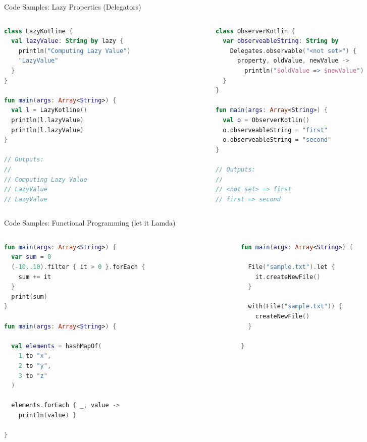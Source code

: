 \begin{frame}[fragile]{Code Samples: Lazy Properties (Delegators)}
	\begin{columns}
		\begin{column}{0.5\textwidth}
\begin{lstlisting}[language=Kotlin,basicstyle=\ttfamily\tiny]
class LazyKotline {
  val lazyValue: String by lazy {
    println("Computing Lazy Value")
    "LazyValue"
  }
}

fun main(args: Array<String>) {
  val l = LazyKotline()
  println(l.lazyValue)
  println(l.lazyValue)
}

// Outputs:
//
// Computing Lazy Value
// LazyValue
// LazyValue
\end{lstlisting}
		\end{column}
		\begin{column}{0.5\textwidth}
\begin{lstlisting}[language=Kotlin,basicstyle=\ttfamily\tiny]
class ObserverKotlin {
  var observeableString: String by
    Delegates.observable("<not set>") {
      property, oldValue, newValue ->
        println("$oldValue => $newValue")
  }
}

fun main(args: Array<String>) {
  val o = ObserverKotlin()
  o.observeableString = "first"
  o.observeableString = "second"
}

// Outputs:
//
// <not set> => first
// first => second
\end{lstlisting}
		\end{column}
	\end{columns}
\end{frame}

\begin{frame}[fragile]{Code Samples: Functional Programming (let it Lamda)}
	\begin{columns}
		\begin{column}{0.5\textwidth}
\begin{lstlisting}[language=Kotlin,basicstyle=\ttfamily\tiny]
fun main(args: Array<String>) {
  var sum = 0
  (-10..10).filter { it > 0 }.forEach {
    sum += it
  }
  print(sum)
}

fun main(args: Array<String>) {

  val elements = hashMapOf(
    1 to "x",
    2 to "y",
    3 to "z"
  )

  elements.forEach { _, value ->
    println(value) }

}
\end{lstlisting}
		\end{column}
		\begin{column}{0.5\textwidth}
\begin{lstlisting}[language=Kotlin,basicstyle=\ttfamily\tiny]
fun main(args: Array<String>) {

  File("sample.txt").let {
    it.createNewFile()
  }

  with(File("sample.txt")) {
    createNewFile()
  }

}
\end{lstlisting}
		\end{column}
	\end{columns}
\end{frame}

